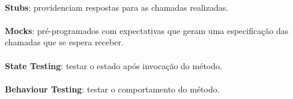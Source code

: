 \documentclass[../resumosLPOO.tex]{subfiles}
\begin{document}
\paragraph{}

\textbf{Stubs}: providenciam respostas para as chamadas realizadas.

\paragraph{}

\textbf{Mocks}: pré-programados com expectativas que geram uma especificação das chamadas que se espera receber.

\paragraph{}

\textbf{State Testing}: testar o estado após invocação do método.

\paragraph{}

\textbf{Behaviour Testing}: testar o comportamento do método.
\end{document}
